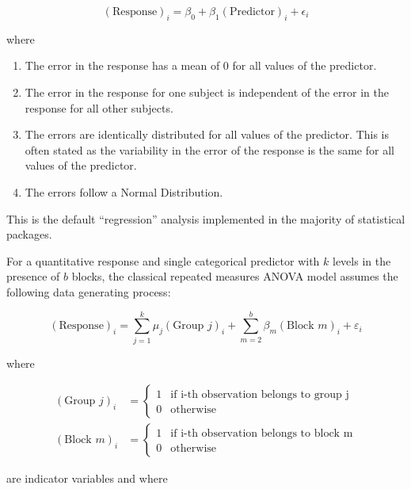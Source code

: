 \documentclass[
  letterpaper,
  DIV=11,
  numbers=noendperiod]{scrreprt}
\providecommand{\tightlist}{%
  \setlength{\itemsep}{0pt}\setlength{\parskip}{0pt}}\usepackage{longtable,booktabs,array}
\theoremstyle{plain}
\theoremstyle{definition}
\theoremstyle{definition}
\theoremstyle{remark}
\begin{document}
\[(\text{Response})_i = \beta_0 + \beta_1 (\text{Predictor})_{i} + \epsilon_i\]

where

\begin{enumerate}
\def\labelenumi{\arabic{enumi}.}
\tightlist
\item
  The error in the response has a mean of 0 for all values of the
  predictor.
\item
  The error in the response for one subject is independent of the error
  in the response for all other subjects.
\item
  The errors are identically distributed for all values of the
  predictor. This is often stated as the variability in the error of the
  response is the same for all values of the predictor.
\item
  The errors follow a Normal Distribution.
\end{enumerate}

This is the default ``regression'' analysis implemented in the majority
of statistical packages.

\begin{description}
\tightlist
\item[Classical Repeated Measures ANOVA Model
(Definition~\ref{def-classical-repeated-measures-anova})]
For a quantitative response and single categorical predictor with \(k\)
levels in the presence of \(b\) blocks, the classical repeated measures
ANOVA model assumes the following data generating process:
\end{description}

\[(\text{Response})_i = \sum_{j=1}^{k} \mu_j (\text{Group } j)_i + \sum_{m=2}^{b} \beta_m (\text{Block } m)_i + \varepsilon_i\]

where

\[
\begin{aligned}
  (\text{Group } j)_{i} &= \begin{cases}
    1 & \text{if i-th observation belongs to group j} \\
    0 & \text{otherwise}
    \end{cases} \\
  (\text{Block } m)_{i} &= \begin{cases}
    1 & \text{if i-th observation belongs to block m} \\
    0 & \text{otherwise}
    \end{cases}
\end{aligned}
\]

are indicator variables and where
\end{document}
